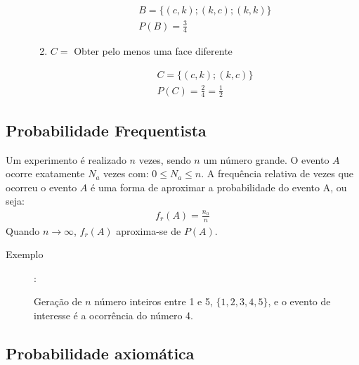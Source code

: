 \begin{description}
\begin{enumerate}[label=(\alph*)]
        \begin{align*}
          B= \{ (c,k) ; (k,c) ; (k,k) \} \\
          P(B)= \frac{3}{4}
        \end{align*}

      \item $C=$ Obter pelo menos uma face diferente

        \begin{align*}
          C= \{ (c,k) ; (k,c) \} \\
          P(C)= \frac{2}{4}= \frac{1}{2}
        \end{align*}
    \end{enumerate}

\end{description}
\subsection{Probabilidade Frequentista}

Um experimento é realizado  $n$ vezes, sendo $n$ um número grande. O evento $A$ ocorre exatamente $N_a$ vezes com: $0 \le N_a \le n$. A frequência relativa de vezes que ocorreu o evento $A$ é uma forma de aproximar a probabilidade do evento A, ou seja:
\begin{align}
  f_r (A)= \frac{n_a}{n} 
\end{align}
Quando $n \to \infty$, $f_r(A)$ aproxima-se de $P(A)$.
\begin{description}
  \item[Exemplo]: 

    Geração de $n$ número inteiros entre 1 e 5, $\{ 1,2,3,4,5 \}$, e o evento de interesse é a ocorrência do número 4.
\end{description}
\subsection{Probabilidade axiomática}

